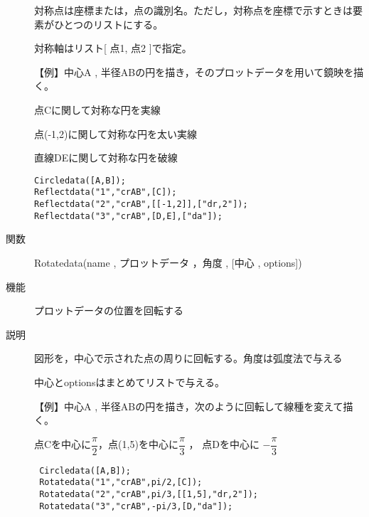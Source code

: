 \documentclass[papersize,a4paper,10pt,uplatex]{jsarticle}
\begin{document}
\begin{description}
対称点は座標または，点の識別名。ただし，対称点を座標で示すときは要素がひとつのリストにする。

対称軸はリスト[ 点1, 点2 ]で指定。

\vspace{\baselineskip}
【例】中心A , 半径ABの円を描き，そのプロットデータを用いて鏡映を描く。

点Cに関して対称な円を実線

点(-1,2)に関して対称な円を太い実線

直線DEに関して対称な円を破線

\begin{verbatim}
Circledata([A,B]);
Reflectdata("1","crAB",[C]);
Reflectdata("2","crAB",[[-1,2]],["dr,2"]);
Reflectdata("3","crAB",[D,E],["da"]);
\end{verbatim}

\vspace{\baselineskip}
 \begin{center}  \end{center}


\vspace{\baselineskip}
\hypertarget{rotatedata}{}
\item[関数]Rotatedata(name , プロットデータ ，角度 , [中心 , options])
\item[機能]プロットデータの位置を回転する
\item[説明]図形を，中心で示された点の周りに回転する。角度は弧度法で与える

中心とoptionsはまとめてリストで与える。

\begin{spacing}{1.5}
【例】中心A , 半径ABの円を描き，次のように回転して線種を変えて描く。

 点Cを中心に$\dfrac{\pi}{2} $，点(1,5)を中心に$\dfrac{\pi}{3}$ ， 点Dを中心に $-\dfrac{\pi}{3} $
\end{spacing}
\begin{verbatim}
 Circledata([A,B]);
 Rotatedata("1","crAB",pi/2,[C]);
 Rotatedata("2","crAB",pi/3,[[1,5],"dr,2"]);
 Rotatedata("3","crAB",-pi/3,[D,"da"]);
\end{verbatim}
\vspace{\baselineskip}
\begin{center}\scalebox{0.9}{  }\end{center}
 

\end{description}
\end{document}
